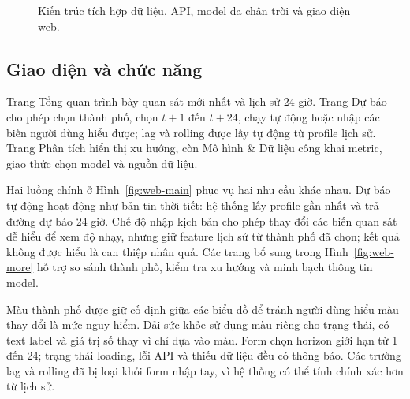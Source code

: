 \documentclass[11pt,a4paper]{article}
\begin{document}
\begin{figure}[H]
\centering
{}
\caption{Kiến trúc tích hợp dữ liệu, API, model đa chân trời và giao diện web.}
\label{fig:architecture}
\end{figure}

\subsection{Giao diện và chức năng}
Trang Tổng quan trình bày quan sát mới nhất và lịch sử 24 giờ. Trang Dự báo cho phép chọn thành phố, chọn $t+1$ đến $t+24$, chạy tự động hoặc nhập các biến người dùng hiểu được; lag và rolling được lấy tự động từ profile lịch sử. Trang Phân tích hiển thị xu hướng, còn Mô hình \& Dữ liệu công khai metric, giao thức chọn model và nguồn dữ liệu.

Hai luồng chính ở Hình~\ref{fig:web-main} phục vụ hai nhu cầu khác nhau. Dự báo tự động hoạt động như bản tin thời tiết: hệ thống lấy profile gần nhất và trả đường dự báo 24 giờ. Chế độ nhập kịch bản cho phép thay đổi các biến quan sát dễ hiểu để xem độ nhạy, nhưng giữ feature lịch sử từ thành phố đã chọn; kết quả không được hiểu là can thiệp nhân quả. Các trang bổ sung trong Hình~\ref{fig:web-more} hỗ trợ so sánh thành phố, kiểm tra xu hướng và minh bạch thông tin model.

Màu thành phố được giữ cố định giữa các biểu đồ để tránh người dùng hiểu màu thay đổi là mức nguy hiểm. Dải sức khỏe sử dụng màu riêng cho trạng thái, có text label và giá trị số thay vì chỉ dựa vào màu. Form chọn horizon giới hạn từ 1 đến 24; trạng thái loading, lỗi API và thiếu dữ liệu đều có thông báo. Các trường lag và rolling đã bị loại khỏi form nhập tay, vì hệ thống có thể tính chính xác hơn từ lịch sử.
\end{document}
